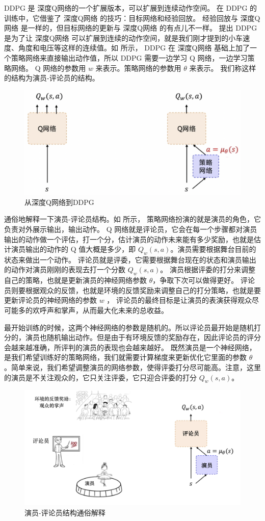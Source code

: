 DDPG 是 深度Q网络的一个扩展版本，可以扩展到连续动作空间。
在 DDPG 的训练中，它借鉴了 深度Q网络 的技巧：目标网络和经验回放。
经验回放与 深度Q网络 是一样的，但目标网络的更新与 深度Q网络 的有点儿不一样。
提出 DDPG 是为了让 深度Q网络 可以扩展到连续的动作空间，就是我们刚才提到的小车速度、角度和电压等这样的连续值。如 所示，
DDPG 在 深度Q网络 基础上加了一个策略网络来直接输出动作值，所以 DDPG 需要一边学习 Q 网络，一边学习策略网络。
Q 网络的参数用 $w$ 来表示。策略网络的参数用 $\theta$ 来表示。
我们称这样的结构为演员-评论员的结构。

\begin{figure}[hbt]
  \centering
  \includegraphics[width=0.5\linewidth]{res/ch12/12.5}
  \caption{从深度Q网络到DDPG}
  \label{fig:fig12.5}
\end{figure}

通俗地解释一下演员-评论员结构。如 所示，
策略网络扮演的就是演员的角色，它负责对外展示输出，输出动作。
Q 网络就是评论员，它会在每一个步骤都对演员输出的动作做一个评估，打一个分，估计演员的动作未来能有多少奖励，也就是估计演员输出的动作的 Q 值大概是多少，即 $Q_w(s,a)$。演员需要根据舞台目前的状态来做出一个动作。
评论员就是评委，它需要根据舞台现在的状态和演员输出的动作对演员刚刚的表现去打一个分数 $Q_w(s,a)$。
演员根据评委的打分来调整自己的策略，也就是更新演员的神经网络参数 $\theta$，争取下次可以做得更好。
评论员则要根据观众的反馈，也就是环境的反馈奖励来调整自己的打分策略，也就是要更新评论员的神经网络的参数 $w$ ，
评论员的最终目标是让演员的表演获得观众尽可能多的欢呼声和掌声，从而最大化未来的总收益。

最开始训练的时候，这两个神经网络的参数是随机的。所以评论员最开始是随机打分的，演员也随机输出动作。但是由于有环境反馈的奖励存在，因此评论员的评分会越来越准确，所评判的演员的表现也会越来越好。
既然演员是一个神经网络，是我们希望训练好的策略网络，我们就需要计算梯度来更新优化它里面的参数 $\theta$ 。简单来说，我们希望调整演员的网络参数，使得评委打分尽可能高。注意，这里的演员是不关注观众的，它只关注评委，它只迎合评委的打分 $Q_w(s,a)$。

\begin{figure}[hbt]
  \centering
  \includegraphics[width=0.5\linewidth]{res/ch12/12.6}
  \caption{演员-评论员结构通俗解释}
  \label{fig:fig12.6}
\end{figure}


